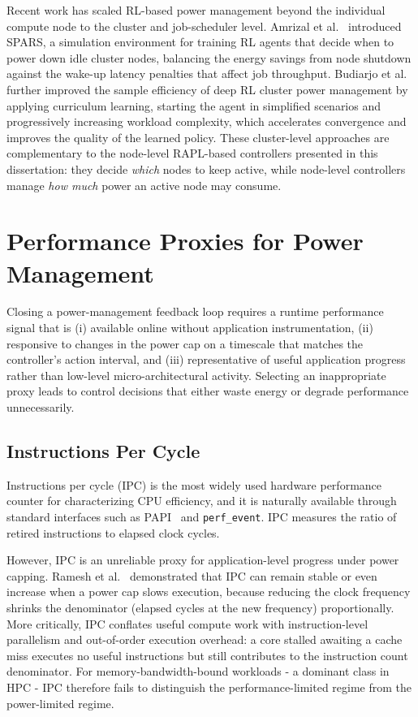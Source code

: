 Recent work has scaled RL-based power management beyond the individual compute
node to the cluster and job-scheduler level.
Amrizal et al.~\cite{amrizal2025spars} introduced SPARS, a simulation environment
for training RL agents that decide when to power down idle cluster nodes, balancing
the energy savings from node shutdown against the wake-up latency penalties that
affect job throughput.
Budiarjo et al.~\cite{budiarjo2025curriculum} further improved the sample efficiency
of deep RL cluster power management by applying curriculum learning, starting the
agent in simplified scenarios and progressively increasing workload complexity, which
accelerates convergence and improves the quality of the learned policy.
These cluster-level approaches are complementary to the node-level RAPL-based
controllers presented in this dissertation: they decide \emph{which} nodes to keep
active, while node-level controllers manage \emph{how much} power an active node
may consume.

\section{Performance Proxies for Power Management}
\label{sec:litrev_perf_proxies}

Closing a power-management feedback loop requires a runtime performance signal
that is (i) available online without application instrumentation, (ii)
responsive to changes in the power cap on a timescale that matches the
controller's action interval, and (iii) representative of useful application
progress rather than low-level micro-architectural activity.
Selecting an inappropriate proxy leads to control decisions that either waste
energy or degrade performance unnecessarily.

\subsection{Instructions Per Cycle}

Instructions per cycle (IPC) is the most widely used hardware performance
counter for characterizing CPU efficiency, and it is naturally available through
standard interfaces such as PAPI~\cite{mucci1999papi} and
\texttt{perf\_event}.  IPC measures the ratio of retired instructions to elapsed
clock cycles.

However, IPC is an unreliable proxy for application-level progress under power
capping.  Ramesh et al.~\cite{ramesh2019understanding} demonstrated that IPC
can remain stable or even increase when a power cap slows execution, because
reducing the clock frequency shrinks the denominator (elapsed cycles at the new
frequency) proportionally.  More critically, IPC conflates useful compute work
with instruction-level parallelism and out-of-order execution overhead: a core
stalled awaiting a cache miss executes no useful instructions but still
contributes to the instruction count denominator.  For memory-bandwidth-bound
workloads - a dominant class in HPC - IPC therefore fails to distinguish the
performance-limited regime from the power-limited regime.

